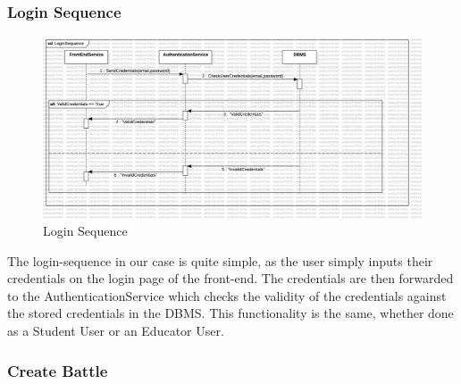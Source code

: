\subsubsection{Login Sequence}
\begin{figure}[H]
    \centering
    \includegraphics[width=\textwidth]{Graphics/Sequence Diagrams/LoginSequence.png}
    \caption{Login Sequence}
    \label{fig:login}
\end{figure}
The login-sequence in our case is quite simple, as the user simply inputs their credentials on the login page of the front-end. The credentials are then forwarded to the AuthenticationService which checks the validity of the credentials against the stored credentials in the DBMS. This functionality is the same, whether done as a Student User or an Educator User.

\subsubsection{Create Battle}

